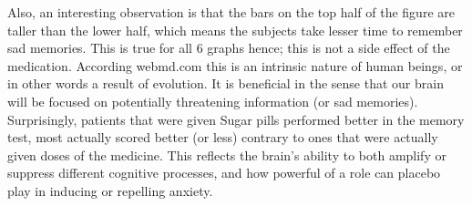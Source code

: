 \documentclass[
]{article}
\begin{document}
Also, an interesting observation is that the bars on the top half of the
figure are taller than the lower half, which means the subjects take
lesser time to remember sad memories. This is true for all 6 graphs
hence; this is not a side effect of the medication. According webmd.com
this is an intrinsic nature of human beings, or in other words a result
of evolution. It is beneficial in the sense that our brain will be
focused on potentially threatening information (or sad memories).
Surprisingly, patients that were given Sugar pills performed better in
the memory test, most actually scored better (or less) contrary to ones
that were actually given doses of the medicine. This reflects the
brain's ability to both amplify or suppress different cognitive
processes, and how powerful of a role can placebo play in inducing or
repelling anxiety.
\end{document}
